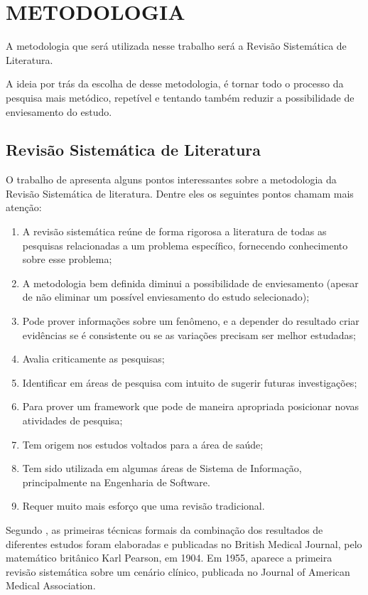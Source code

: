 
\chapter{METODOLOGIA}
\label{cap:metodologia}
   A metodologia que será utilizada nesse trabalho será a Revisão Sistemática de Literatura. 
   
   A ideia por trás da escolha de desse metodologia, é tornar todo o processo da pesquisa mais metódico,  repetível e tentando também reduzir a possibilidade de enviesamento do estudo.  
	
\section{Revisão Sistemática de Literatura}

O trabalho de \cite{keele_guidelines_2007} apresenta alguns pontos interessantes sobre a metodologia da Revisão Sistemática de literatura. Dentre eles os seguintes pontos chamam mais atenção:

\begin{enumerate}
    \item A revisão sistemática reúne de forma rigorosa a literatura de todas as pesquisas relacionadas a um problema específico, fornecendo conhecimento sobre esse problema;
    \item A metodologia bem definida diminui a possibilidade de enviesamento (apesar de não eliminar um possível enviesamento do estudo selecionado);
    \item Pode prover informações sobre um fenômeno, e a depender do resultado criar evidências se é consistente ou se as variações precisam ser melhor estudadas;  
    \item Avalia criticamente as pesquisas;
    \item Identificar em áreas de pesquisa com intuito de sugerir futuras investigações;
    \item Para prover um framework que pode de maneira apropriada posicionar novas atividades de pesquisa;
    \item Tem origem nos estudos voltados para a área de saúde;
    \item Tem sido utilizada em algumas áreas de Sistema de Informação, principalmente na Engenharia de Software.
    \item Requer muito mais esforço que uma revisão tradicional.
\end{enumerate}

Segundo \cite{Cordeiro-2007}, as primeiras técnicas formais da combinação dos resultados de diferentes estudos foram elaboradas e publicadas no British Medical Journal, pelo matemático britânico Karl Pearson, em 1904. Em 1955, aparece a primeira revisão sistemática sobre um cenário clínico, publicada no Journal of American Medical Association.

